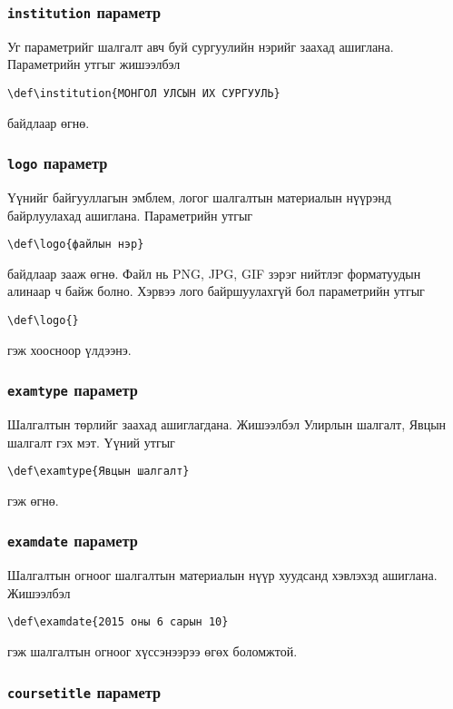\documentclass[10pt]{article}
\theoremstyle{definition}
\begin{document}
\subsubsection{\texttt{institution} параметр}

Уг параметрийг шалгалт авч буй сургуулийн нэрийг заахад ашиглана. Параметрийн утгыг жишээлбэл 
\begin{verbatim}
\def\institution{МОНГОЛ УЛСЫН ИХ СУРГУУЛЬ}
\end{verbatim}
байдлаар өгнө.

\subsubsection{\texttt{logo} параметр}

Үүнийг байгууллагын эмблем, логог шалгалтын материалын нүүрэнд  байрлуулахад ашиглана. Параметрийн утгыг 
\begin{verbatim}
\def\logo{файлын нэр}
\end{verbatim}
байдлаар зааж өгнө. Файл нь PNG, JPG, GIF зэрэг нийтлэг форматуудын алинаар ч байж болно. Хэрвээ лого байршуулахгүй бол параметрийн утгыг 
\begin{verbatim}
\def\logo{}
\end{verbatim}
гэж хоосноор үлдээнэ.

\subsubsection{\texttt{examtype} параметр}

Шалгалтын төрлийг заахад ашиглагдана. Жишээлбэл Улирлын шалгалт, Явцын шалгалт гэх мэт. Үүний утгыг
\begin{verbatim}
\def\examtype{Явцын шалгалт}
\end{verbatim}
гэж өгнө.

\subsubsection{\texttt{examdate} параметр}

Шалгалтын огноог шалгалтын материалын нүүр хуудсанд хэвлэхэд ашиглана. Жишээлбэл 
\begin{verbatim}
\def\examdate{2015 оны 6 сарын 10}
\end{verbatim}
гэж шалгалтын огноог хүссэнээрээ өгөх боломжтой.

\subsubsection{\texttt{coursetitle} параметр}
\end{document}
